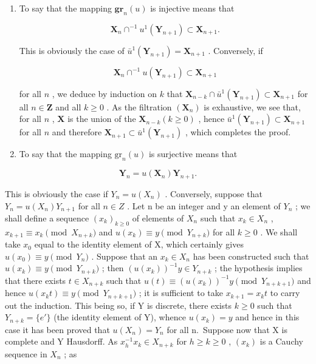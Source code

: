 \begin{enumerate}
\def\labelenumi{(\roman{enumi})}
\tightlist
\item
  To say that the mapping \(\mathbf{gr}_n(u)\) is injective means that

\[
\mathbf {X} _ {n} \cap^ {- 1} u ^ {1} (\mathbf {Y} _ {n + 1}) \subset \mathbf {X} _ {n + 1}.
\]

This is obviously the case of \(\bar{u}^1 (\mathbf{Y}_{n + 1}) = \mathbf{X}_{n + 1}\) . Conversely, if

\[
\mathbf {X} _ {n} \cap^ {- 1} u (\mathbf {Y} _ {n + 1}) \subset \mathbf {X} _ {n + 1}
\]

for all \(n\) , we deduce by induction on \(k\) that \(\mathbf{X}_{n-k} \cap \bar{u}^1(\mathbf{Y}_{n+1}) \subset \mathbf{X}_{n+1}\) for all \(n \in \mathbf{Z}\) and all \(k \geqslant 0\) . As the filtration \((\mathbf{X}_n)\) is exhaustive, we see that, for all \(n\) , \(\mathbf{X}\) is the union of the \(\mathbf{X}_{n-k} (k \geqslant 0)\) , hence \(\bar{u}^1(\mathbf{Y}_{n+1}) \subset \mathbf{X}_{n+1}\) for all \(n\) and therefore \(\mathbf{X}_{n+1} \subset \bar{u}^1(\mathbf{Y}_{n+1})\) , which completes the proof.

\item
  To say that the mapping \(\mathrm{gr}_n(u)\) is surjective means that
\end{enumerate}

\[
\mathbf {Y} _ {n} = u (\mathbf {X} _ {n}) \mathbf {Y} _ {n + 1}.
\]

This is obviously the case if \(Y_{n}=u(X_{n})\) . Conversely, suppose that \(Y_{n}=u(X_{n})Y_{n+1}\) for all \(n\in Z\) . Let n be an integer and y an element of \(Y_{n}\) ; we shall define a sequence \((x_{k})_{k\geq0}\) of elements of \(X_{n}\) such that \(x_{k}\in X_{n}\) , \(x_{k+1}\equiv x_{k} \pmod{X_{n+k}}\) and \(u(x_{k})\equiv y \pmod{Y_{n+k}}\) for all \(k\geq0\) . We shall take \(x_{0}\) equal to the identity element of X, which certainly gives \(u(x_{0})\equiv y \pmod{Y_{n}}\) . Suppose that an \(x_{k}\in X_{n}\) has been constructed such that \(u(x_{k})\equiv y \pmod{Y_{n+k}}\) ; then \((u(x_{k}))^{-1}y\in Y_{n+k}\) ; the hypothesis implies that there exists \(t\in X_{n+k}\) such that \(u(t)\equiv(u(x_{k}))^{-1}y \pmod{Y_{n+k+1}}\) and hence \(u(x_{k}t)\equiv y \pmod{Y_{n+k+1}}\) ; it is sufficient to take \(x_{k+1}=x_{k}t\) to carry out the induction. This being so, if Y is discrete, there exists \(k\geq0\) such that \(Y_{n+k}=\{e'\}\) (the identity element of Y), whence \(u(x_{k})=y\) and hence in this case it has been proved that \(u(X_{n})=Y_{n}\) for all n.~Suppose now that X is complete and Y Hausdorff. As \(x_{h}^{-1}x_{k}\in X_{n+k}\) for \(h\geq k\geq0\) , \((x_{k})\) is a Cauchy sequence in \(X_{n}\) ; as

